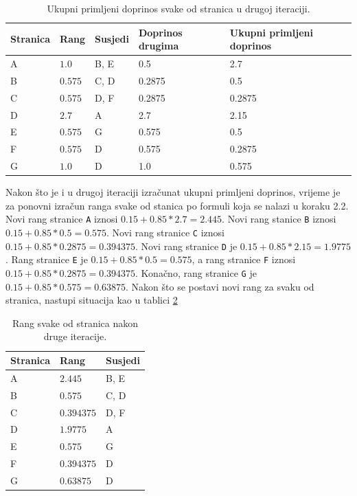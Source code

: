 \documentclass[times, utf8, zavrsni, numeric]{fer}
\begin{document}
\begin{table}[htb]
\caption{Ukupni primljeni doprinos svake od stranica u drugoj iteraciji.}
\label{tbl:pageRankKorak22ap2}
\centering
\begin{tabular}{lllll} 
\hline
Stranica & Rang & Susjedi & Doprinos drugima & Ukupni primljeni doprinos\\
\hline
A & $1.0$ & B, E & 0.5 & 2.7\\
B & $0.575$ & C, D & 0.2875 & 0.5\\
C & $0.575$ & D, F & 0.2875 & 0.2875\\
D & $2.7$ & A & 2.7 & 2.15\\
E & $0.575$ & G & 0.575 & 0.5\\
F & $0.575$ & D & 0.575 & 0.2875\\
G & $1.0$ & D & 1.0 & 0.575\\
\hline
\end{tabular}
\end{table}

Nakon što je i u drugoj iteraciji izračunat ukupni primljeni doprinos, vrijeme je za ponovni izračun ranga svake od stanica po formuli koja se nalazi u koraku 2.2. Novi rang stranice \texttt{A} iznosi $0.15 + 0.85 * 2.7 = 2.445$. Novi rang stanice \texttt{B} iznosi $0.15 + 0.85 * 0.5 = 0.575$. Novi rang stranice \texttt{C} iznosi $0.15 + 0.85 * 0.2875 = 0.394375 $. Novi rang stranice \texttt{D} je $0.15 + 0.85 * 2.15 = 1.9775$.
Rang stranice \texttt{E} je $0.15 + 0.85 * 0.5 = 0.575$, a rang stranice \texttt{F} iznosi $0.15 + 0.85 * 0.2875 = 0.394375$. Konačno, rang stranice \texttt{G} je $0.15 + 0.85 * 0.575 = 0.63875$. Nakon što se postavi novi rang za svaku od stranica, nastupi situacija kao u tablici \ref{tbl:pageRankStanje2}

\begin{table}[htb]
\caption{Rang svake od stranica nakon druge iteracije.}
\label{tbl:pageRankStanje2}
\centering
\begin{tabular}{lll} 
\hline
Stranica & Rang & Susjedi \\
\hline
A & $2.445$ & B, E\\
B & $0.575$ & C, D\\
C & $0.394375$ & D, F\\
D & $1.9775$ & A\\
E & $0.575$ & G\\
F & $0.394375$ & D\\
G & $0.63875$ & D\\
\hline
\end{tabular}
\end{table}
\end{document}
